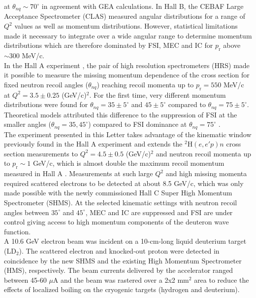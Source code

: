\documentclass[aps,prl,twocolumn,showpacs,superscriptaddress,groupedaddress,nofootinbib]{revtex4-2}  %
\begin{document}
at $\theta_{nq} \sim 70^{\circ}$ in agreement with GEA \cite{Sargsian_2001,PhysRevC.56.1124} calculations. In Hall B, the CEBAF Large Acceptance Spectrometer (CLAS) measured angular
distributions for  a range of $Q^2$ values as well as momentum distributions. However, statistical limitations made it necessary to integrate over a wide angular range to determine momentum distributions
which are therefore dominated by  FSI, MEC and IC for $p_{\mathrm{r}}$ above $\sim 300$ MeV/c. \\
\indent In the Hall A experiment \cite{PhysRevLett.107.262501}, the pair of high resolution spectrometers (HRS) made it possible to measure the missing momentum dependence of the cross section for fixed neutron recoil angles ($\theta_{nq}$)
reaching recoil momenta up to $p_{\mathrm{r}}=550$ MeV/c at $Q^{2}=3.5\pm0.25$ (GeV/c)$^{2}$. For the first time, very different momentum distributions were found for $\theta_{nq}=35\pm5^{\circ}$
and $45\pm5^{\circ}$ compared to  $\theta_{nq}=75\pm5^{\circ}$. Theoretical models attributed this difference  to the suppression of FSI at the smaller angles ($\theta_{nq}=35, 45^{\circ}$) compared to FSI
dominance at $\theta_{nq}=75^{\circ}$ \cite{PhysRevLett.107.262501}. \\
\indent The experiment presented in this Letter takes advantage of the kinematic window previously found in the Hall A experiment \cite{PhysRevLett.107.262501} and extends the $^{2}\mathrm{H}(e,e'p)n$ cross section measurements
to $Q^{2}=4.5\pm0.5$ (GeV/c)$^{2}$ and neutron recoil momenta up to $p_{\mathrm{r}}\sim 1$ GeV/c, which is almost double the maximum recoil momentum measured in Hall A \cite{PhysRevLett.107.262501}.
Measurements at such large $Q^{2}$ and high missing momenta required scattered electrons to be detected at about 8.5 GeV/c, which was only made possible with the newly commissioned Hall C Super High Momentum Spectrometer (SHMS).
At the selected kinematic settings with neutron recoil angles between $35^{\circ}$ and $45^{\circ}$, MEC and IC are suppressed and FSI are under control giving access to high momentum components of the deuteron wave function.\\
\indent A 10.6 GeV electron beam was incident on a 10-cm-long liquid deuterium target (LD$_{2}$). The scattered electron and knocked-out proton were detected in coincidence
by the new SHMS and the existing High Momentum Spectrometer (HMS), respectively. The beam currents delivered by the accelerator ranged between 45-60 $\mu$A and the beam was rastered over a 2x2 mm$^{2}$ area to reduce the effects of localized boiling on the cryogenic targets (hydrogen and deuterium).\\
\end{document}
